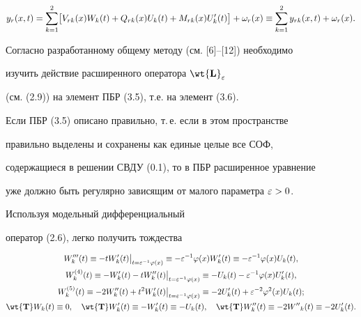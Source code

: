\begin{equation}


y_r (x, t) = \sum \limits_{k=1}^2 \bigl[ V_{rk} (x) W_k (t) +


Q_{rk} (x) U_k (t) + M_{rk} (x) U'_k (t) \bigr] + \o_r (x)


\equiv \sum \limits_{k=1}^2 y_{rk}(x,t) + \omega_r (x). 


\end{equation}





Согласно разработанному общему методу (см. [6]--[12]) необходимо


изучить действие расширенного оператора $\bold{\wt{L}}_{\e}$


(см. (2.9)) на элемент ПБР (3.5), т.е. на элемент (3.6).





Если ПБР (3.5) описано правильно, т.\,е. если в этом пространстве


правильно выделены и сохранены как единые целые все СОФ,


содержащиеся в решении СВДУ (0.1), то в ПБР расширенное уравнение


уже должно быть регулярно зависящим от малого параметра $\varepsilon > 0$.





Используя модельный дифференциальный


оператор (2.6), легко получить тождества


\begin{gather}


W'''_k (t) \equiv - t W'_k (t)


\big|_{t= \e^{-1} \f(x)}\equiv


-\e^{-1} \f(x) W'_k (t) \equiv -\e^{-1} \f(x) U_k (t), \notag \\


%


W_k ^{(4)} (t) \equiv - W'_k (t) - t W''_k (t)


\big|_{t= \e^{-1} \f(x)}\equiv -U_k (t) -


\e^{-1} \f (x) U'_k (t), \\


%


W_k ^{(5)} (t) \equiv -2 W''_k (t) + t^2 W'_k (t)


\big|_{t= \e^{-1} \f(x)}\equiv


-2 U'_k (t) + \e^{-2} \f^2 (x) U_k (t);\notag \\


%


\wt{\bold{T}} W_k (t) \equiv 0, \quad \bold{\wt{T}} W'_k (t) \equiv -


W'_k (t) \equiv - U_k (t), \quad \bold{\wt{T}}


W''_k (t) \equiv -2{W''}_k (t) \equiv -2U'_k (t).


\end{gather}



